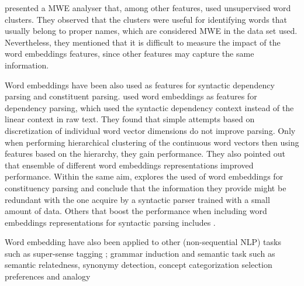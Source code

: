 \documentclass[11pt]{article}
\begin{document}
 presented a MWE analyser that, among other features, used unsupervised word clusters. 
They observed that the clusters were useful for identifying words that usually belong to proper names, which are considered MWE in the data set used. Nevertheless, they mentioned that it is difficult to measure the impact of the word embeddings features, since other features may capture the same information. 

Word embeddings have been also used as features for syntactic dependency parsing and constituent parsing. 
 used word embeddings as features for dependency parsing, which used the syntactic dependency context instead of the linear context in raw text. They found that simple attempts based on discretization of individual word vector dimensions do not improve parsing. Only when performing hierarchical clustering of the continuous word vectors then using features based on the hierarchy, they gain performance. They also pointed out that ensemble of different word embeddings representations improved performance.
Within the same aim, \cite{Andreas:Klein:2014} explores the used of word embeddings for constituency parsing and conclude that the
information they provide might be redundant with the one acquire by a syntactic parser trained with a small amount of data. Others that boost the performance when including word embeddings representations for syntactic parsing includes \cite{Koo:2008,Koo:2010,Haffari:2011,Tratz:2011}.

Word embedding have also been applied to other (non-sequential NLP) tasks such as super-sense tagging \cite{Grave:2013}; grammar induction \cite{Spitkovsky:2011} and semantic task such as semantic relatedness, synonymy detection, concept categorization selection preferences and analogy \cite{baroni:2014}

\end{document}

